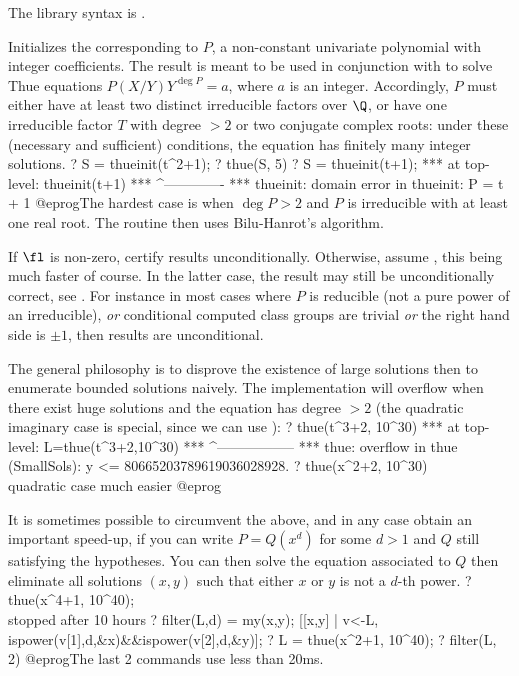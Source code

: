 The library syntax is .

\label{se:thueinit}
Initializes the  corresponding to $P$, a non-constant
univariate polynomial with integer coefficients.
The result is meant to be used in conjunction with  to solve Thue
equations $P(X / Y)Y^{\deg P} = a$, where $a$ is an integer. Accordingly,
$P$ must either have at least two distinct irreducible factors over $\Q$,
or have one irreducible factor $T$ with degree $>2$ or two conjugate
complex roots: under these (necessary and sufficient) conditions, the
equation has finitely many integer solutions.
\bprog
? S = thueinit(t^2+1);
? thue(S, 5)
? S = thueinit(t+1);
 ***   at top-level: thueinit(t+1)
 ***                 ^-------------
 *** thueinit: domain error in thueinit: P = t + 1
@eprog\noindent The hardest case is when $\deg P > 2$ and $P$ is irreducible
with at least one real root. The routine then uses Bilu-Hanrot's algorithm.

If $\fl$ is non-zero, certify results unconditionally. Otherwise, assume
, this being much faster of course. In the latter case, the result
may still be unconditionally correct, see . For instance in most
cases where $P$ is reducible (not a pure power of an irreducible), \emph{or}
conditional computed class groups are trivial \emph{or} the right hand side
is $\pm1$, then results are unconditional.

 The general philosophy is to disprove the existence of large
solutions then to enumerate bounded solutions naively. The implementation
will overflow when there exist huge solutions and the equation has degree
$> 2$ (the quadratic imaginary case is special, since we can use
):
\bprog
? thue(t^3+2, 10^30)
 ***   at top-level: L=thue(t^3+2,10^30)
 ***                   ^-----------------
 *** thue: overflow in thue (SmallSols): y <= 80665203789619036028928.
? thue(x^2+2, 10^30)  \\ quadratic case much easier
@eprog

 It is sometimes possible to circumvent the above, and in any
case obtain an important speed-up, if you can write $P = Q(x^d)$ for some $d >
1$ and $Q$ still satisfying the  hypotheses. You can then solve
the equation associated to $Q$ then eliminate all solutions $(x,y)$ such that
either $x$ or $y$ is not a $d$-th power.
\bprog
? thue(x^4+1, 10^40); \\ stopped after 10 hours
? filter(L,d) =
    my(x,y); [[x,y] | v<-L, ispower(v[1],d,&x)&&ispower(v[2],d,&y)];
? L = thue(x^2+1, 10^40);
? filter(L, 2)
@eprog\noindent The last 2 commands use less than 20ms.

